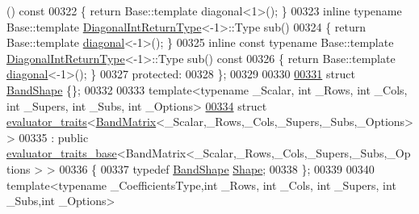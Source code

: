 \begin{DoxyCode}
      ()\textcolor{keyword}{ const}
00322 \textcolor{keyword}{    }\{ \textcolor{keywordflow}{return} Base::template diagonal<1>(); \}
00323     \textcolor{keyword}{inline} \textcolor{keyword}{typename} Base::template \hyperlink{struct_eigen_1_1internal_1_1_band_matrix_base_1_1_diagonal_int_return_type}{DiagonalIntReturnType}<-1>::Type sub()
00324     \{ \textcolor{keywordflow}{return} Base::template \hyperlink{class_eigen_1_1internal_1_1_band_matrix_base_abce1c4d69e72ec594f67a841d1040606}{diagonal}<-1>(); \}
00325     \textcolor{keyword}{inline} \textcolor{keyword}{const} \textcolor{keyword}{typename} Base::template \hyperlink{struct_eigen_1_1internal_1_1_band_matrix_base_1_1_diagonal_int_return_type}{DiagonalIntReturnType}<-1>::Type sub()\textcolor{keyword}{ const}
00326 \textcolor{keyword}{    }\{ \textcolor{keywordflow}{return} Base::template \hyperlink{class_eigen_1_1internal_1_1_band_matrix_base_abce1c4d69e72ec594f67a841d1040606}{diagonal}<-1>(); \}
00327   \textcolor{keyword}{protected}:
00328 \};
00329 
00330 
\hyperlink{struct_eigen_1_1internal_1_1_band_shape}{00331} \textcolor{keyword}{struct }\hyperlink{struct_eigen_1_1internal_1_1_band_shape}{BandShape} \{\};
00332 
00333 \textcolor{keyword}{template}<\textcolor{keyword}{typename} \_Scalar, \textcolor{keywordtype}{int} \_Rows, \textcolor{keywordtype}{int} \_Cols, \textcolor{keywordtype}{int} \_Supers, \textcolor{keywordtype}{int} \_Subs, \textcolor{keywordtype}{int} \_Options>
\hyperlink{struct_eigen_1_1internal_1_1evaluator__traits_3_01_band_matrix_3_01___scalar_00_01___rows_00_01_ce5c440dcbb14a96e9ed2eb62b54545a}{00334} \textcolor{keyword}{struct }\hyperlink{struct_eigen_1_1internal_1_1evaluator__traits}{evaluator\_traits}<\hyperlink{group___core___module_class_eigen_1_1internal_1_1_band_matrix}{BandMatrix}<\_Scalar,\_Rows,\_Cols,\_Supers,\_Subs,\_Options> >
00335   : \textcolor{keyword}{public} \hyperlink{struct_eigen_1_1internal_1_1evaluator__traits__base}{evaluator\_traits\_base}<BandMatrix<\_Scalar,\_Rows,\_Cols,\_Supers,\_Subs,\_Options
      > >
00336 \{
00337   \textcolor{keyword}{typedef} \hyperlink{struct_eigen_1_1internal_1_1_band_shape}{BandShape} \hyperlink{struct_eigen_1_1internal_1_1_band_shape}{Shape};
00338 \};
00339 
00340 \textcolor{keyword}{template}<\textcolor{keyword}{typename} \_CoefficientsType,\textcolor{keywordtype}{int} \_Rows, \textcolor{keywordtype}{int} \_Cols, \textcolor{keywordtype}{int} \_Supers, \textcolor{keywordtype}{int} \_Subs,\textcolor{keywordtype}{int} \_Options>

\end{DoxyCode}

